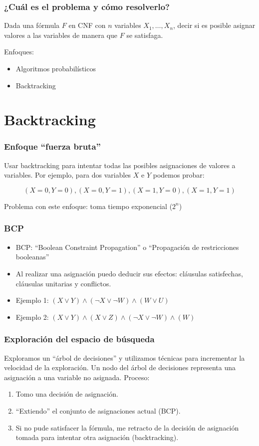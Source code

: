 \documentclass{beamer}
\begin{document}
\frame
{
  \frametitle{¿Cuál es el problema y cómo resolverlo?}

  Dada una fórmula $F$ en CNF con $n$ variables $X_1, \ldots, X_n$, decir si es
  posible asignar valores a las variables de manera que $F$ se satisfaga.

  Enfoques:

  \begin{itemize}
  \item Algoritmos probabilísticos
  \item Backtracking
  \end{itemize}
}

\section{Backtracking}

\frame
{
  \frametitle{Enfoque ``fuerza bruta''}

  Usar backtracking para intentar todas las posibles asignaciones de valores a variables. Por
  ejemplo, para dos variables $X$ e $Y$ podemos probar:

  $$
  (X=0,Y=0), (X=0,Y=1), (X=1,Y=0), (X=1,Y=1)
  $$

  Problema con este enfoque: toma tiempo exponencial ($2^n$)
}

\frame
{
  \frametitle{BCP}

  \begin{itemize}
   \item BCP: ``Boolean Constraint Propagation'' o ``Propagación de restricciones booleanas''
   \item Al realizar una asignación puedo deducir sus efectos: cláusulas satisfechas, cláusulas unitarias y conflictos.
   \item Ejemplo 1: $(X \vee Y) \wedge (\neg X \vee \neg W) \wedge (W \vee U)$
   \item Ejemplo 2: $(X \vee Y) \wedge (X \vee Z) \wedge (\neg X \vee \neg W) \wedge (W)$
  \end{itemize}
}

\frame
{
  \frametitle{Exploración del espacio de búsqueda}

  Exploramos un ``árbol de decisiones'' y utilizamos técnicas
  para incrementar la velocidad de la exploración. Un nodo del árbol
  de decisiones representa una asignación a una variable no asignada.
  Proceso:

  \begin{enumerate}
   \item Tomo una decisión de asignación.
   \item ``Extiendo'' el conjunto de asignaciones actual (BCP).
   \item Si no pude satisfacer la fórmula, me retracto de la decisión de
         asignación tomada para intentar otra asignación (backtracking).
  \end{enumerate}
}
\end{document}
